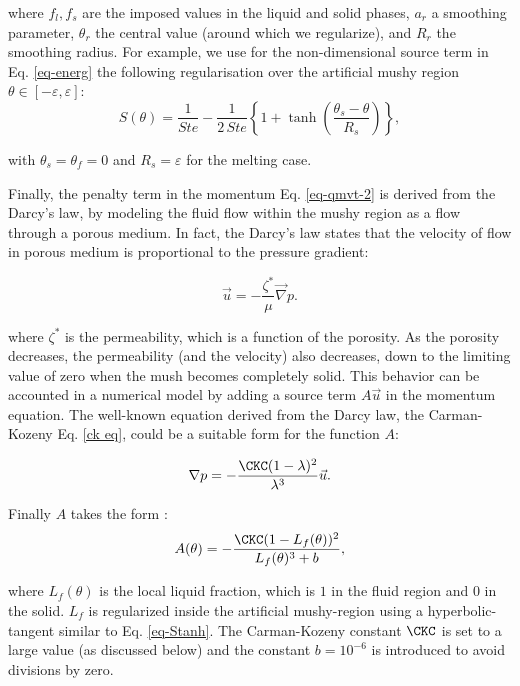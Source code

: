 \noindent where $f_l, f_s$ are the imposed values in the liquid and solid phases, $a_r$ a smoothing  parameter, $\theta_r$ the central value (around which we regularize), and $R_r$ the smoothing radius. For example, we use for the non-dimensional source term in Eq. \ref{eq-energ} the following regularisation over the artificial mushy region $\theta \in [-\varepsilon, \varepsilon]$:
\begin{equation}
S(\theta) = \frac{1}{Ste} - \frac{1}{2\,Ste}\left\{
1 + \tanh\left(\frac{\theta_s-\theta}{R_s}\right)
\right\},
\label{eq-Stanh}
\end{equation} 

\noindent with $\theta_s=\theta_f=0$ and $R_s=\varepsilon$ for the melting case. 

Finally, the penalty term in the momentum Eq. \ref{eq-qmvt-2} is derived from the Darcy's law, by modeling the fluid flow within the mushy region as a flow through a porous medium.
In fact, the Darcy's law states that the velocity of flow in porous medium is proportional to the pressure gradient:

\begin{equation}
	\vec u = - \frac{\zeta^*}{\mu} \vec \nabla p.
\end{equation}

\noindent where $\zeta^*$ is the permeability, which is a function of the porosity.
As the porosity decreases, the permeability (and the velocity) also decreases, down to the limiting value of zero when the mush becomes completely solid.
This behavior can be accounted in a numerical model by adding a source term $A \vec u$ in the momentum equation.
The well-known equation derived from the Darcy law, the Carman-Kozeny Eq. \ref{ck eq}, could be a suitable form for the function $A$:

\begin{equation} \label{ck eq}
	\nabla p = - \frac{\CKC (1 - \lambda)^2}{\lambda^3} \vec u.
\end{equation}

\noindent Finally $A$ takes the form \citep{Belhamadia2012,kheirabadi2015effect}:
\begin{equation}\label{eq-CK}
A(\theta) = -\frac{\CKC (1 - L_f(\theta))^2}{L_f(\theta)^3 + b}, 
\end{equation}

\noindent where $L_f(\theta)$ is the local liquid fraction, which is  $1$ in the fluid region and  $0$ in the solid. $L_f$ is regularized inside the artificial  mushy-region using a hyperbolic-tangent similar to Eq. \ref{eq-Stanh}.
The Carman-Kozeny constant $\CKC$ is set to a  large value (as discussed below) and  the constant $b=10^{-6}$ is introduced to avoid divisions by zero.

